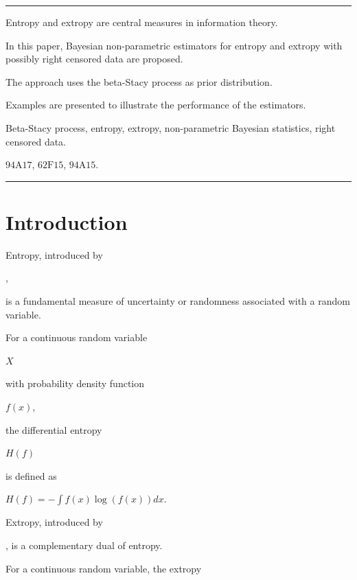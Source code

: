 \documentclass[10pt,twoside]{article}
\numberwithin{equation}{section}
\begin{document}
\rule{\textwidth}{0.2mm}





Entropy and extropy are central measures in information theory. 

In this paper, Bayesian non-parametric estimators for entropy and extropy with possibly right censored data are proposed. 

The approach uses the beta-Stacy process as prior distribution. 

Examples are presented to illustrate the performance of the estimators.

 


Beta-Stacy process, entropy, extropy, non-parametric Bayesian statistics, right censored data.



$\mathrm{94A17}$, $\mathrm{62F15}$, $\mathrm{94A15}$. 


\hspace{1cm}\rule{\textwidth}{0.2mm}



\section{Introduction}

Entropy, introduced by 

\citep{10}, 

is a fundamental measure of uncertainty or randomness associated with a random variable. 

For a continuous random variable 

$X$ 

with probability density function 

$f(x)$, 

the differential entropy 

$H(f)$ 

is defined as 

$H(f) = -\int f(x) \log(f(x)) dx$. 

Extropy, introduced by 


\citep{7}, is a complementary dual of entropy. 

For a continuous random variable, the extropy 
\end{document}

